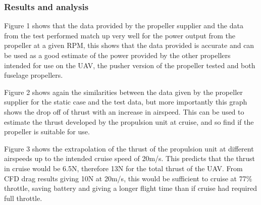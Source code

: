 \documentclass[../../main.tex]{subfiles}
\begin{document}
\subsubsection{Results and analysis} \label{sec:design-process:interim-design-review:motor-and-propellor-test:results-and-analysis}


Figure 1 shows that the data provided by the propeller supplier and the data from the test performed match up very well for the power output from the propeller at a given RPM, this shows that the data provided is accurate and can be used as a good estimate of the power provided by the other propellers intended for use on the UAV, the pusher version of the propeller tested and both fuselage propellers. 


Figure 2 shows again the similarities between the data given by the propeller supplier for the static case and the test data, but more importantly this graph shows the drop off of thrust with an increase in airspeed.
This can be used to estimate the thrust developed by the propulsion unit at cruise, and so find if the propeller is suitable for use.


Figure 3 shows the extrapolation of the thrust of the propulsion unit at different airspeeds up to the intended cruise speed of 20m/s.
This predicts that the thrust in cruise would be 6.5N, therefore 13N for the total thrust of the UAV.
From CFD drag results giving 10N at 20m/s, this would be sufficient to cruise at 77\% throttle, saving battery and giving a longer flight time than if cruise had required full throttle. 

\end{document}
